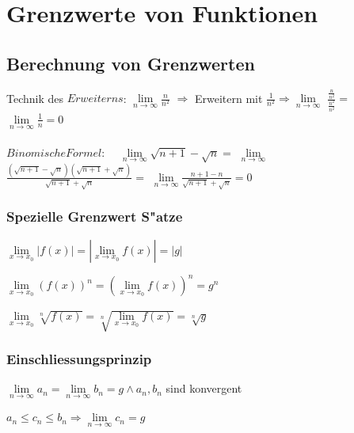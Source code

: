\section{Grenzwerte von Funktionen}

	\subsection{Berechnung von Grenzwerten}
		Technik des $Erweiterns$: $\lim\limits_{n\to\infty} \frac{n}{n^2}$
		$\Longrightarrow $ Erweitern mit
		$\frac{1}{n^2} \Longrightarrow \lim\limits_{n\to\infty}$
		$\frac{\frac{n}{n^2}}{\frac{n^2}{n^2}} =$
		$\lim\limits_{n\to\infty} \frac{1}{n} = 0 $\\\\
		$Binomische Formel$: $\quad\lim\limits_{n\to\infty}\sqrt{n+1}-\sqrt{n} =$ 
		$\lim\limits_{n\to\infty} $
		$\frac{(\sqrt{n+1}-\sqrt{n})(\sqrt{n+1}+\sqrt{n})}{\sqrt{n+1}+\sqrt{n}} = $
		$\lim\limits_{n\to\infty} \frac{n+1-n}{\sqrt{n+1}+\sqrt{n}}= 0$

	\subsubsection{Spezielle Grenzwert S"atze}
		\begin{minipage}[t]{6 cm}
			$\lim\limits_{x\to x_0} |f(x)| = |\lim\limits_{x\to x_0} f(x)| = |g|$\\
		\end{minipage}
		\begin{minipage}[t]{6 cm}
			$\lim\limits_{x\to x_0} (f(x))^n = (\lim\limits_{x\to x_0} f(x))^n = g^n$ \\
		\end{minipage}
		\begin{minipage}[t]{6 cm}
			$\lim\limits_{x\to x_0} \sqrt[n]{f(x)} = \sqrt[n]{\lim\limits_{x\to x_0} f(x)} = \sqrt[n]{g}$
		\end{minipage}

	\subsubsection{Einschliessungsprinzip}
		\begin{minipage}[t]{9 cm}
			$\lim\limits_{n \to \infty} a_n = \lim\limits_{n \to \infty} b_n = g \wedge a_n, b_n$ sind konvergent\\
		\end{minipage}
		\begin{minipage}[t]{9 cm}
			$a_n \leq c_n \leq b_n \Rightarrow \lim\limits_{n \to \infty} c_n = g$
		\end{minipage}

